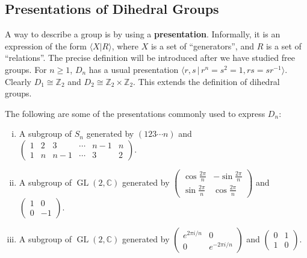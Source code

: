 \subsection{Presentations of Dihedral Groups}
A way to describe a group is by using a \textbf{presentation}. Informally, it is an expression
of the form $\langle X | R\rangle$, where $X$ is a set of ``generators'', and $R$ is  a set
of ``relations''. The precise definition will be introduced after we have studied free groups. For $n\geq 1$, $D_{n}$ has a usual presentation $\langle r,s\,|\, r^n=s^2=1, rs=sr^{-1}\rangle$. Clearly $D_{1}\cong \mathbb{Z}_2$ and $D_{2}\cong \mathbb{Z}_2\times \mathbb{Z}_2$. This extends the definition of dihedral groups.

The following are some of the presentations commonly used to express $D_n$:
\begin{enumerate}[(i)]
	\item A subgroup of $S_n$ generated by $(123\cdots n)$ and $\begin{pmatrix}
		1 & 2 & 3 & \cdots & n-1 & n\\
	1	 & n & n-1 & \cdots & 3 & 2
	\end{pmatrix}$.
	\item A subgroup of $\operatorname{GL}(2,\mathbb{C})$ generated by $\begin{pmatrix}
		\cos\frac{2\pi}{n} & -\sin\frac{2\pi}{n}
		\\
		\sin\frac{2\pi}{n} & \cos\frac{2\pi}{n}
	\end{pmatrix}$ and $\begin{pmatrix}
	1 & 0 \\
	0 & -1
	\end{pmatrix}$.
	\item A subgroup of $\operatorname{GL}(2,\mathbb{C})$ generated by $\begin{pmatrix}
		e^{2\pi i/n} & 0
		\\
		0 & e^{-2\pi i/n}
	\end{pmatrix}$ and $\begin{pmatrix}
		0 & 1 \\
		1 & 0
	\end{pmatrix}$.
\end{enumerate}

